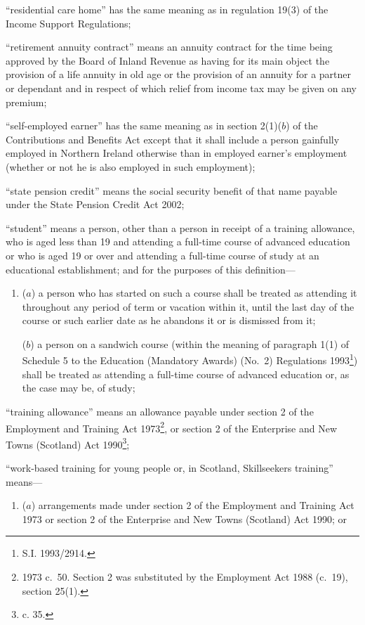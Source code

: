 \documentclass[12pt,a4paper]{article}
\begin{document}
\begin{enumerate}
“residential care home” has the same meaning as in regulation 19(3) of the Income Support Regulations;

“retirement annuity contract” means an annuity contract for the time being approved by the Board of Inland Revenue as having for its main object the provision of a life annuity in old age or the provision of an annuity for a partner or dependant and in respect of which relief from income tax may be given on any premium;

“self-employed earner” has the same meaning as in section 2(1)($b$)  of the Contributions and Benefits Act except that it shall include a person gainfully employed in Northern Ireland otherwise than in employed earner’s employment (whether or not he is also employed in such employment);

“state pension credit” means the social security benefit of that name payable under the State Pension Credit Act 2002;

“student” means a person, other than a person in receipt of a training allowance, who is aged less than 19 and attending a full-time course of advanced education or who is aged 19 or over and attending a full-time course of study at an educational establishment; and for the purposes of this definition—
\begin{enumerate}\item[]
($a$) 
a person who has started on such a course shall be treated as attending it throughout any period of term or vacation within it, until the last day of the course or such earlier date as he abandons it or is dismissed from it;

($b$) 
a person on a sandwich course (within the meaning of paragraph 1(1) of Schedule 5 to the Education (Mandatory Awards) (No.\ 2) Regulations 1993\footnote{\frenchspacing S.I. 1993/2914.}) shall be treated as attending a full-time course of advanced education or, as the case may be, of study;
\end{enumerate}

“training allowance” means an allowance payable under section 2 of the Employment and Training Act 1973\footnote{1973 c.\ 50. Section 2 was substituted by the Employment Act 1988 (c.\ 19), section 25(1).}, or section 2 of the Enterprise and New Towns (Scotland) Act 1990\footnote{ c. 35.};

“work-based training for young people or, in Scotland, Skillseekers training” means—
\begin{enumerate}\item[]
($a$) 
arrangements made under section 2 of the Employment and Training Act 1973 or section 2 of the Enterprise and New Towns (Scotland) Act 1990; or


\end{enumerate}
\end{enumerate}
\end{document}
